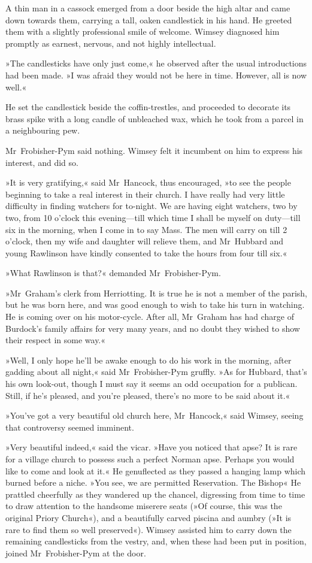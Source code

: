 A thin man in a cassock emerged from a door beside the high altar and came down towards them, carrying a tall, oaken candlestick in his hand. He greeted them with a slightly professional smile of welcome. Wimsey diagnosed him promptly as earnest, nervous, and not highly intellectual.

»The candlesticks have only just come,« he observed after the usual introductions had been made. »I was afraid they would not be here in time. However, all is now well.«

He set the candlestick beside the coffin-trestles, and proceeded to decorate its brass spike with a long candle of unbleached wax, which he took from a parcel in a neighbouring pew.

Mr~Frobisher-Pym said nothing. Wimsey felt it incumbent on him to express his interest, and did so.

»It is very gratifying,« said Mr~Hancock, thus encouraged, »to see the people beginning to take a real interest in their church. I have really had very little difficulty in finding watchers for to-night. We are having eight watchers, two by two, from 10 o'clock this evening—till which time I shall be myself on duty—till six in the morning, when I come in to say Mass. The men will carry on till 2 o'clock, then my wife and daughter will relieve them, and Mr~Hubbard and young Rawlinson have kindly consented to take the hours from four till six.«

»What Rawlinson is that?« demanded Mr~Frobisher-Pym.

»Mr~Graham's clerk from Herriotting. It is true he is not a member of the parish, but he was born here, and was good enough to wish to take his turn in watching. He is coming over on his motor-cycle. After all, Mr~Graham has had charge of Burdock's family affairs for very many years, and no doubt they wished to show their respect in some way.«

»Well, I only hope he'll be awake enough to do his work in the morning, after gadding about all night,« said Mr~Frobisher-Pym gruffly. »As for Hubbard, that's his own look-out, though I must say it seems an odd occupation for a publican. Still, if he's pleased, and you're pleased, there's no more to be said about it.«

»You've got a very beautiful old church here, Mr~Hancock,« said Wimsey, seeing that controversy seemed imminent.

»Very beautiful indeed,« said the vicar. »Have you noticed that apse? It is rare for a village church to possess such a perfect Norman apse. Perhaps you would like to come and look at it.« He genuflected as they passed a hanging lamp which burned before a niche. »You see, we are permitted Reservation. The Bishop\longdash« He prattled cheerfully as they wandered up the chancel, digressing from time to time to draw attention to the handsome miserere seats (»Of course, this was the original Priory Church«), and a beautifully carved piscina and aumbry (»It is rare to find them so well preserved«). Wimsey assisted him to carry down the remaining candlesticks from the vestry, and, when these had been put in position, joined Mr~Frobisher-Pym at the door.


